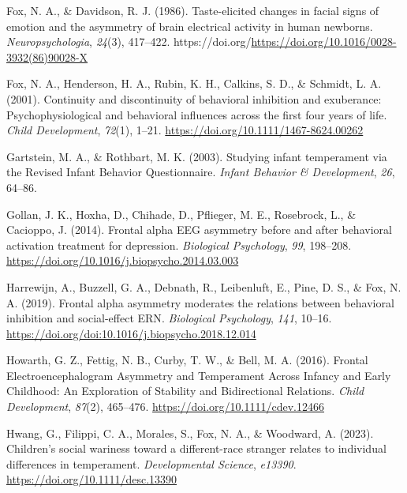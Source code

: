 \documentclass[
  man,
  floatsintext,
  longtable,
  nolmodern,
  notxfonts,
  notimes,
  colorlinks=true,linkcolor=blue,citecolor=blue,urlcolor=blue]{apa7}
\newlength{\cslhangindent}
\newenvironment{CSLReferences}[2] %
 {\begin{list}{}{%
  \setlength{\itemindent}{0pt}
  \setlength{\leftmargin}{0pt}
  \setlength{\parsep}{0pt}
  \ifodd #1
   \setlength{\leftmargin}{\cslhangindent}
   \setlength{\itemindent}{-1\cslhangindent}
  \fi
  \setlength{\itemsep}{#2\baselineskip}}}
 {\end{list}}
\begin{document}
\begin{CSLReferences}{1}{0}
Fox, N. A., \& Davidson, R. J. (1986). Taste-elicited changes in facial
signs of emotion and the asymmetry of brain electrical activity in human
newborns. \emph{Neuropsychologia}, \emph{24}(3), 417--422.
https://doi.org/\url{https://doi.org/10.1016/0028-3932(86)90028-X}

Fox, N. A., Henderson, H. A., Rubin, K. H., Calkins, S. D., \& Schmidt,
L. A. (2001). Continuity and discontinuity of behavioral inhibition and
exuberance: Psychophysiological and behavioral influences across the
first four years of life. \emph{Child Development}, \emph{72}(1), 1--21.
\url{https://doi.org/10.1111/1467-8624.00262}

Gartstein, M. A., \& Rothbart, M. K. (2003). Studying infant temperament
via the {Revised Infant Behavior Questionnaire}. \emph{Infant Behavior
\& Development}, \emph{26}, 64--86.

Gollan, J. K., Hoxha, D., Chihade, D., Pflieger, M. E., Rosebrock, L.,
\& Cacioppo, J. (2014). Frontal alpha {EEG} asymmetry before and after
behavioral activation treatment for depression. \emph{Biological
Psychology}, \emph{99}, 198--208.
\url{https://doi.org/10.1016/j.biopsycho.2014.03.003}

Harrewijn, A., Buzzell, G. A., Debnath, R., Leibenluft, E., Pine, D. S.,
\& Fox, N. A. (2019). Frontal alpha asymmetry moderates the relations
between behavioral inhibition and social-effect {ERN}. \emph{Biological
Psychology}, \emph{141}, 10--16.
\url{https://doi.org/doi:10.1016/j.biopsycho.2018.12.014}

Howarth, G. Z., Fettig, N. B., Curby, T. W., \& Bell, M. A. (2016).
Frontal {Electroencephalogram Asymmetry} and {Temperament Across
Infancy} and {Early Childhood}: {An Exploration} of {Stability} and
{Bidirectional Relations}. \emph{Child Development}, \emph{87}(2),
465--476. \url{https://doi.org/10.1111/cdev.12466}

Hwang, G., Filippi, C. A., Morales, S., Fox, N. A., \& Woodward, A.
(2023). Children's social wariness toward a different-race stranger
relates to individual differences in temperament. \emph{Developmental
Science}, \emph{e13390}. \url{https://doi.org/10.1111/desc.13390}


\end{CSLReferences}
\end{document}
